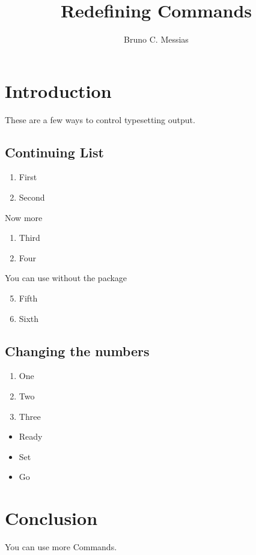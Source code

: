 \documentclass{article}
\title{Redefining Commands}
\author{Bruno C. Messias}
\date{}
\begin{document}
\maketitle

\section{Introduction}

These are a few ways to control typesetting output.

\subsection{Continuing List}

\begin{enumerate}
    \item First
    \item Second
\end{enumerate}

Now more

\begin{enumerate}[resume]
    \item Third
    \item Four
\end{enumerate}


You can use without the package

\begin{enumerate}
    \setcounter{enumi}{4}
    \item Fifth
    \item Sixth
\end{enumerate}

\subsection{Changing the numbers}

\renewcommand{\theenumi}{\Alph{enumi}}
\begin{enumerate}
    \item One
    \item Two
    \item Three
\end{enumerate}


\renewcommand{\labelitemi}{$\rightarrow$}
\begin{itemize}
    \item Ready
    \item Set
    \item Go
\end{itemize}

\section{Conclusion}


You can use more Commands.
\end{document}
